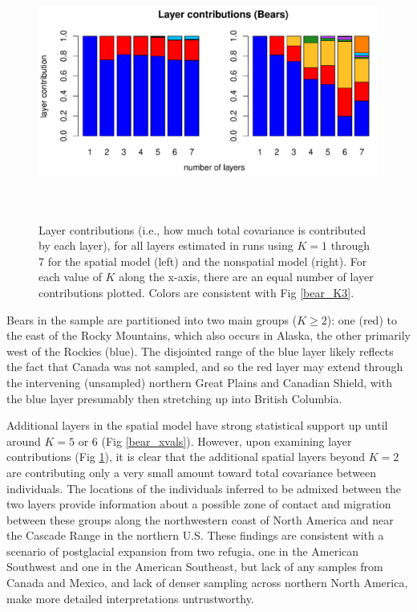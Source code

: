 \documentclass[12pt]{article}
\begin{document}
\begin{figure}
	\centering
		{\includegraphics[width=6in,height=3in]{figs/bears/bears_laycon_barplots.pdf}}
	\caption{
	Layer contributions (i.e., how much total covariance is contributed by each layer), 
	for all layers estimated in runs using $K = 1$ through 7 
	for the spatial model (left) and the nonspatial model (right).
	For each value of $K$ along the x-axis, there are an equal number of layer contributions plotted.
	Colors are consistent with Fig \ref{bear_K3}.
    }\label{bear_laycon}
\end{figure}

Bears in the sample are partitioned into two main groups ($K \geq 2$):
one (red) to the east of the Rocky Mountains, 
which also occurs in Alaska,
the other primarily west of the Rockies (blue).
The disjointed range of the blue layer likely reflects the fact
that Canada was not sampled, 
and so the red layer may extend
through the intervening (unsampled) northern Great Plains and Canadian Shield, 
with the blue layer presumably then stretching up into British Columbia.

Additional layers in the spatial model have strong statistical support 
up until around $K=5$ or 6 (Fig \ref{bear_xvals}).
However, upon examining layer contributions (Fig \ref{bear_laycon}),
it is clear that the additional spatial layers beyond $K=2$ are contributing only a very small amount toward 
total covariance between individuals.
The locations of the individuals inferred to be admixed between the two layers 
provide information about a possible zone of contact and migration between these groups 
along the northwestern coast of North America and near the Cascade Range in the northern U.S.
These findings are consistent with a scenario of postglacial expansion from two refugia, 
one in the American Southwest and one in the American Southeast, 
but lack of any samples from Canada and Mexico, 
and lack of denser sampling across northern North America, 
make more detailed interpretations untrustworthy.
\end{document}

